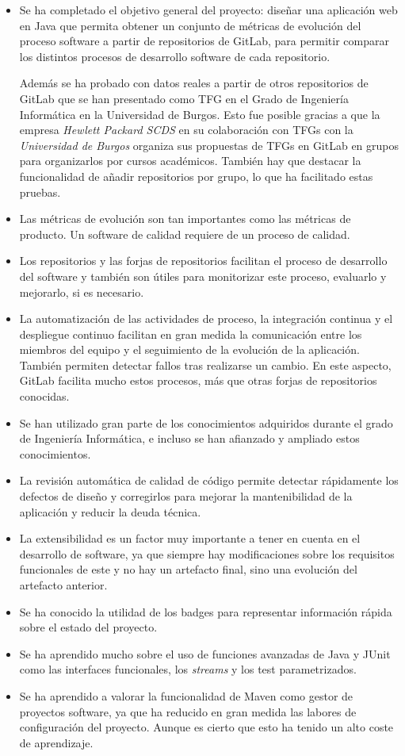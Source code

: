 \begin{itemize}
	\item Se ha completado el objetivo general del proyecto: diseñar una aplicación web en Java que permita obtener un conjunto de métricas de evolución del proceso software \cite{ratzinger_space:_2007} a partir de repositorios de GitLab, para permitir comparar los distintos procesos de desarrollo software de cada repositorio. 
	
	Además se ha probado con datos reales a partir de otros repositorios de GitLab que se han presentado como TFG en el Grado de Ingeniería Informática en la Universidad de Burgos. Esto fue posible gracias a que la empresa \textit{Hewlett Packard SCDS} en su colaboración con TFGs con la \textit{Universidad de Burgos} organiza sus propuestas de TFGs en GitLab en grupos para organizarlos por cursos académicos. También hay que destacar la funcionalidad de añadir repositorios por grupo, lo que ha facilitado estas pruebas.
	
	\item Las métricas de evolución son tan importantes como las métricas de producto. Un software de calidad requiere de un proceso de calidad.
	\item Los repositorios y las forjas de repositorios facilitan el proceso de desarrollo del software y también son útiles para monitorizar este proceso, evaluarlo y mejorarlo, si es necesario.
	\item La automatización de las actividades de proceso, la integración continua y el despliegue continuo facilitan en gran medida la comunicación entre los miembros del equipo y el seguimiento de la evolución de la aplicación. También permiten detectar fallos tras realizarse un cambio. En este aspecto, GitLab facilita mucho estos procesos, más que otras forjas de repositorios conocidas.
	\item Se han utilizado gran parte de los conocimientos adquiridos durante el grado de Ingeniería Informática, e incluso se han afianzado y ampliado estos conocimientos.
	\item La revisión automática de calidad de código permite detectar rápidamente los defectos de diseño y corregirlos para mejorar la mantenibilidad de la aplicación y reducir la deuda técnica.
	\item La extensibilidad es un factor muy importante a tener en cuenta en el desarrollo de software, ya que siempre hay modificaciones sobre los requisitos funcionales de este y no hay un artefacto final, sino una evolución del artefacto anterior.
	\item Se ha conocido la utilidad de los badges para representar información rápida sobre el estado del proyecto.
	\item Se ha aprendido mucho sobre el uso de funciones avanzadas de Java y JUnit como las interfaces funcionales, los \textit{streams} y los test parametrizados.
	\item Se ha aprendido a valorar la funcionalidad de Maven como gestor de proyectos software, ya que ha reducido en gran medida las labores de configuración del proyecto. Aunque es cierto que esto ha tenido un alto coste de aprendizaje.
\end{itemize}

